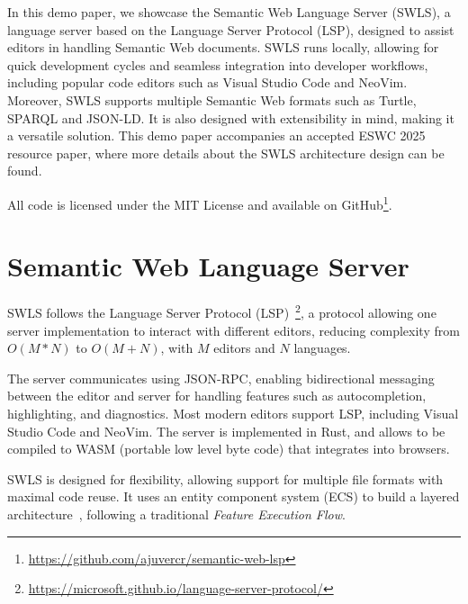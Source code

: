 In this demo paper, we showcase the Semantic Web Language Server (SWLS), a language server based on the Language Server Protocol (LSP), designed to assist editors in handling Semantic Web documents. 
SWLS runs locally, allowing for quick development cycles and seamless integration into developer workflows, including popular code editors such as Visual Studio Code and NeoVim. 
Moreover, SWLS supports multiple Semantic Web formats such as Turtle, SPARQL and JSON-LD.
It is also designed with extensibility in mind, making it a versatile solution. 
This demo paper accompanies an accepted ESWC 2025 resource paper, where more details about the SWLS architecture design can be found.

All code is licensed under the MIT License and available on GitHub\footnote{\url{https://github.com/ajuvercr/semantic-web-lsp}}.

\section{Semantic Web Language Server}

SWLS follows the Language Server Protocol (LSP)~\cite{IntroToLsp}\footnote{\url{https://microsoft.github.io/language-server-protocol/}},
a protocol allowing one server implementation to interact with different editors, reducing complexity from $O(M*N)$ to $O(M+N)$,
with $M$ editors and $N$ languages.

The server communicates using JSON-RPC, enabling bidirectional messaging between the editor and server for handling features such as autocompletion, highlighting, and diagnostics.
Most modern editors support LSP, including Visual Studio Code and NeoVim.
The server is implemented in Rust, and allows to be compiled to WASM (portable low level byte code) that integrates into browsers.

SWLS is designed for flexibility, allowing support for multiple file formats with maximal code reuse. 
It uses an entity component system (ECS) to build a layered architecture~\cite{10.1145/3550355.3552452}, following a traditional \textit{Feature Execution Flow}.

